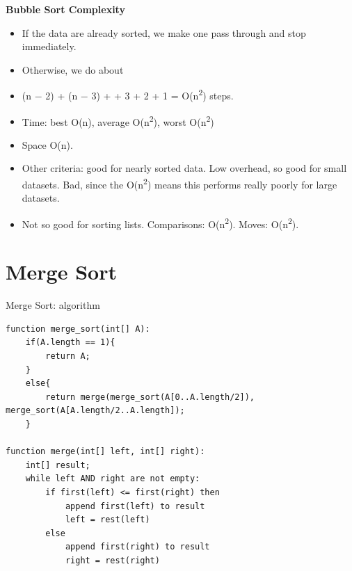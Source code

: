 \documentclass{beamer}
\begin{document}
\begin{frame}
\begin{center}
\textbf{Bubble Sort Complexity}
\end{center}
\begin{itemize}
\item If the data are already sorted, we make one pass through and stop immediately.
\item Otherwise, we do about
\item (n $-$ 2) + (n $-$ 3) + {\textperiodcentered} {\textperiodcentered} {\textperiodcentered} + 3 + 2 + 1 = O(n\textsuperscript{2})
steps.
\end{itemize}

\end{frame} 

\begin{frame}
\begin{itemize}
\item Time: best O(n), average O(n\textsuperscript{2}), worst O(n\textsuperscript{2})
\item Space O(n).
\item Other criteria: good for nearly sorted data. Low overhead, so good for small datasets. Bad, since the O(n\textsuperscript{2}) means
this performs really poorly for large datasets.
\item Not so good for sorting lists. Comparisons: O(n\textsuperscript{2}). Moves: O(n\textsuperscript{2}).
\end{itemize}

\end{frame} 

\section{Merge Sort}
\begin{frame}[fragile]

Merge Sort: algorithm

\begin{block}{}
\begin{lstlisting}
function merge_sort(int[] A): 
    if(A.length == 1){
        return A;
    }
    else{
        return merge(merge_sort(A[0..A.length/2]), merge_sort(A[A.length/2..A.length]);
    }

function merge(int[] left, int[] right):
    int[] result;
    while left AND right are not empty:
        if first(left) <= first(right) then
            append first(left) to result
            left = rest(left)
        else
            append first(right) to result
            right = rest(right)
\end{lstlisting}
\end{block}

\end{frame} 
\end{document}
